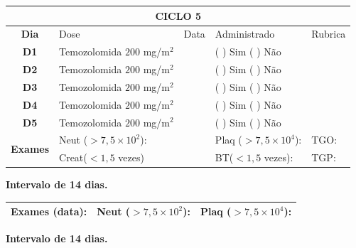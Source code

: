 \documentclass[11pt,a4paper,oldfontcommands]{memoir}
\begin{document}
\begin{center}
\begin{longtable}{p{1cm}p{4cm}|p{1cm}|p{4.6cm}|p{3cm}}
	\hline
	\multicolumn{5}{c}{\textbf{CICLO 5}}\\
\hline
    \multicolumn{1}{c|}{\multirow{1}{*}{\textbf{Dia}}}&{Dose}&{Data}&{Administrado}&{Rubrica} \\
    \hline
    \multicolumn{1}{c|}{\multirow{1}{*}{\textbf{D1}}}&{Temozolomida \(200\) mg/m\(^2\)}&&{(  ) Sim (  ) Não}&\\
    \multicolumn{1}{c|}{\multirow{1}{*}{\textbf{D2}}}&{Temozolomida \(200\) mg/m\(^2\)}&&{(  ) Sim (  ) Não}&\\
    \multicolumn{1}{c|}{\multirow{1}{*}{\textbf{D3}}}&{Temozolomida \(200\) mg/m\(^2\)}&&{(  ) Sim (  ) Não}&\\
    \multicolumn{1}{c|}{\multirow{1}{*}{\textbf{D4}}}&{Temozolomida \(200\) mg/m\(^2\)}&&{(  ) Sim (  ) Não}&\\
    \multicolumn{1}{c|}{\multirow{1}{*}{\textbf{D5}}}&{Temozolomida \(200\) mg/m\(^2\)}&&{(  ) Sim (  ) Não}&\\
    \hline
    \multicolumn{1}{c|}{\multirow{2}{*}{\textbf{Exames}}}&\multicolumn{2}{l|}{Neut (\(>7,5\times10^2\)):}&{Plaq (\(>7,5\times10^4\)):}&{TGO:}\\
    \cline{2-5}
    \multicolumn{1}{c|}{\multirow{2}{*}{{}}}&\multicolumn{2}{l|}{Creat(\(<1,5\) vezes)}&{BT(\(<1,5\) vezes):}&{TGP:}
    \\
    \hline
\end{longtable}
\textbf{Intervalo de 14 dias.}
\begin{longtable}{p{5cm}|p{5cm}|p{4.5cm}}
    \hline
    \textbf{Exames (data):}&{Neut (\(>7,5\times10^2\)):}&{Plaq (\(>7,5\times10^4\)):}
    \\
    \hline
\end{longtable}
\textbf{Intervalo de 14 dias.}
\\[1.5cm]
\end{center}
\end{document}
